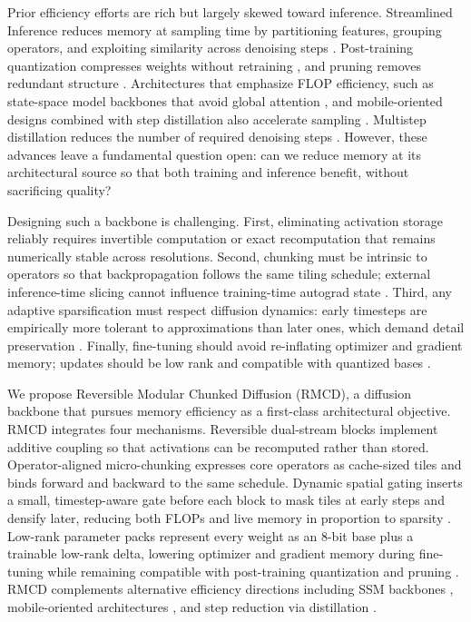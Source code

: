 \documentclass{article}
\begin{document}
Prior efficiency efforts are rich but largely skewed toward inference. Streamlined Inference reduces memory at sampling time by partitioning features, grouping operators, and exploiting similarity across denoising steps \cite{zhan-2024-fast}. Post-training quantization compresses weights without retraining \cite{shang-2022-post}, and pruning removes redundant structure \cite{fang-2023-structural}. Architectures that emphasize FLOP efficiency, such as state-space model backbones that avoid global attention \cite{yan-2023-diffusion}, and mobile-oriented designs combined with step distillation also accelerate sampling \cite{li-2023-snapfusion}. Multistep distillation reduces the number of required denoising steps \cite{salimans-2024-multistep}. However, these advances leave a fundamental question open: can we reduce memory at its architectural source so that both training and inference benefit, without sacrificing quality?

Designing such a backbone is challenging. First, eliminating activation storage reliably requires invertible computation or exact recomputation that remains numerically stable across resolutions. Second, chunking must be intrinsic to operators so that backpropagation follows the same tiling schedule; external inference-time slicing cannot influence training-time autograd state \cite{zhan-2024-fast}. Third, any adaptive sparsification must respect diffusion dynamics: early timesteps are empirically more tolerant to approximations than later ones, which demand detail preservation \cite{author-year-leveraging}. Finally, fine-tuning should avoid re-inflating optimizer and gradient memory; updates should be low rank and compatible with quantized bases \cite{shang-2022-post}.

We propose Reversible Modular Chunked Diffusion (RMCD), a diffusion backbone that pursues memory efficiency as a first-class architectural objective. RMCD integrates four mechanisms. Reversible dual-stream blocks implement additive coupling so that activations can be recomputed rather than stored. Operator-aligned micro-chunking expresses core operators as cache-sized tiles and binds forward and backward to the same schedule. Dynamic spatial gating inserts a small, timestep-aware gate before each block to mask tiles at early steps and densify later, reducing both FLOPs and live memory in proportion to sparsity \cite{author-year-leveraging}. Low-rank parameter packs represent every weight as an 8-bit base plus a trainable low-rank delta, lowering optimizer and gradient memory during fine-tuning while remaining compatible with post-training quantization \cite{shang-2022-post} and pruning \cite{fang-2023-structural}. RMCD complements alternative efficiency directions including SSM backbones \cite{yan-2023-diffusion}, mobile-oriented architectures \cite{li-2023-snapfusion}, and step reduction via distillation \cite{salimans-2024-multistep}.
\end{document}
